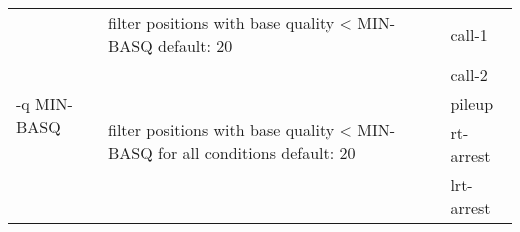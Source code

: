 {\small
\begin{tabular}{@{}p{}p{}l@{}}
\multirow{5}{=}{-q MIN-BASQ} & filter positions with base quality < MIN-BASQ
 default: 20 & call-1 \\
 & \multirow{4}{=}{filter positions with base quality < MIN-BASQ for all conditions
 default: 20} & call-2 \\
 & & pileup \\
 & & rt-arrest \\
 & & lrt-arrest \\
\end{tabular}\\
}
